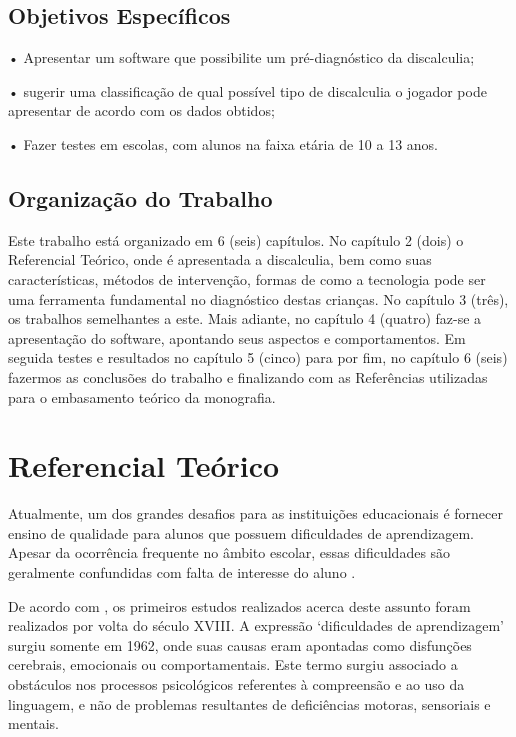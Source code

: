 \documentclass[
	12pt,				%
    oneside,			%
	a4paper,			%
	english,			%
	french,				%
	spanish,			%
	brazil,				%
	]{abntex2}
\begin{document}
\section{Objetivos Específicos}

•	Apresentar  um software  que possibilite um pré-diagnóstico da discalculia;

•   sugerir uma classificação de qual possível tipo de discalculia o jogador pode apresentar de acordo com os dados obtidos; 

•   Fazer testes em escolas, com alunos na faixa etária de 10 a 13 anos.





\section{Organização do Trabalho}
Este trabalho está organizado em 6 (seis) capítulos. No capítulo 2 (dois) o Referencial Teórico, onde é apresentada a discalculia, bem como suas características, métodos de intervenção, formas de como a tecnologia pode ser uma ferramenta fundamental no diagnóstico destas crianças. No capítulo 3 (três), os trabalhos semelhantes a este. Mais adiante, no capítulo 4 (quatro) faz-se a apresentação do software, apontando seus aspectos e comportamentos. Em seguida testes e resultados no capítulo 5 (cinco) para por fim, no capítulo 6 (seis) fazermos as conclusões do trabalho e finalizando com as Referências utilizadas para o embasamento teórico da monografia. 

\chapter{Referencial Teórico}



Atualmente, um dos grandes desafios para as instituições educacionais é fornecer ensino de qualidade para alunos que possuem dificuldades de aprendizagem. Apesar da ocorrência frequente no âmbito escolar, essas dificuldades são geralmente confundidas com falta de interesse do aluno \cite{Spinello}.

De acordo com , os primeiros estudos realizados acerca deste assunto foram realizados por volta do século XVIII. A expressão ‘dificuldades de aprendizagem’ surgiu somente em 1962, onde suas causas eram apontadas como disfunções cerebrais, emocionais ou comportamentais. Este termo surgiu associado a obstáculos nos processos psicológicos referentes à compreensão e ao uso da linguagem, e não de problemas resultantes de deficiências motoras, sensoriais e mentais.  
\end{document}
